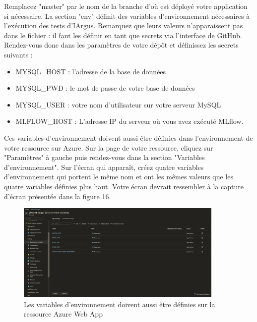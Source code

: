 \documentclass[french]{article}
\begin{document}
    Remplacez "master" par le nom de la branche d'où est déployé votre application si nécessaire. La section "env" définit des variables d'environnement nécessaires à l'exécution des tests d'IArgus. Remarquez que leurs valeurs n'apparaissent pas dans le fichier : il faut les définir en tant que secrets via l'interface de GitHub. Rendez-vous donc dans les paramètres de votre dépôt et définissez les secrets suivants :
    \begin{itemize}
        \item MYSQL\_HOST : l'adresse de la base de données
        \item MYSQL\_PWD : le mot de passe de votre base de données
        \item MYSQL\_USER : votre nom d'utilisateur sur votre serveur MySQL
        \item MLFLOW\_HOST : L'adresse IP du serveur où vous avez exécuté MLflow.
    \end{itemize}

    Ces variables d'environnement doivent aussi être définies dans l'environnement de votre ressource sur Azure. Sur la page de votre ressource, cliquez sur "Paramètres" à gauche puis rendez-vous dans la section "Variables d'environnement". Sur l'écran qui apparaît, créez quatre variables d'environnement qui portent le même nom et ont les mêmes valeurs que les quatre variables définies plus haut. Votre écran devrait ressembler à la capture d'écran présentée dans la figure 16.

    \begin{figure}[h]
        \includegraphics[width=10cm]{azure_2}
        \centering
        \caption{Les variables d'environnement doivent aussi être définies sur la ressource Azure Web App}
    \end{figure}
\end{document}
